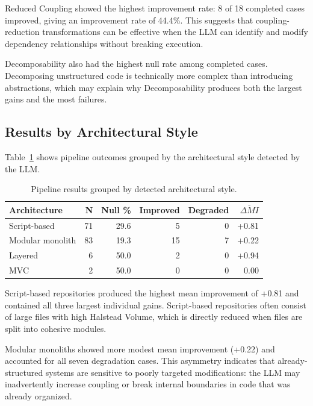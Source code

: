Reduced Coupling showed the highest improvement rate: 8 of 18 completed cases improved, giving an improvement rate of 44.4\%. This suggests that coupling-reduction transformations can be effective when the LLM can identify and modify dependency relationships without breaking execution.

Decomposability also had the highest null rate among completed cases. Decomposing unstructured code is technically more complex than introducing abstractions, which may explain why Decomposability produces both the largest gains and the most failures.

\subsection{Results by Architectural Style}
\label{subsec:eval_arch_results}

Table~\ref{tab:eval_arch_results} shows pipeline outcomes grouped by the architectural style detected by the LLM.

\begin{table}[H]
\centering
\small
\caption{Pipeline results grouped by detected architectural style.}
\label{tab:eval_arch_results}
\begin{tabular}{lrrrrr}
\toprule
\textbf{Architecture} & \textbf{N} & \textbf{Null \%} & \textbf{Improved} & \textbf{Degraded} & $\overline{\Delta MI}$ \\
\midrule
Script-based & 71 & 29.6 & 5 & 0 & +0.81 \\
Modular monolith & 83 & 19.3 & 15 & 7 & +0.22 \\
Layered & 6 & 50.0 & 2 & 0 & +0.94 \\
MVC & 2 & 50.0 & 0 & 0 & 0.00 \\
\bottomrule
\end{tabular}
\end{table}

Script-based repositories produced the highest mean improvement of +0.81 and contained all three largest individual gains. Script-based repositories often consist of large files with high Halstead Volume, which is directly reduced when files are split into cohesive modules.

Modular monoliths showed more modest mean improvement (+0.22) and accounted for all seven degradation cases. This asymmetry indicates that already-structured systems are sensitive to poorly targeted modifications: the LLM may inadvertently increase coupling or break internal boundaries in code that was already organized.

